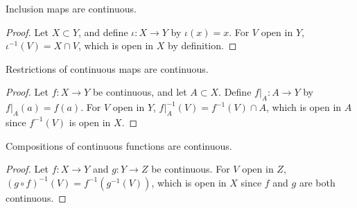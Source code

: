 \documentclass[10pt]{report}
\begin{document}
\begin{prop}
Inclusion maps are continuous.
\end{prop}
\begin{proof}
	Let $X \subset Y$, and define $\iota:X\to Y$ by $\iota(x)=x$. For $V$ open in $Y$, $\iota^{-1}(V)=X \cap V$, which is open in $X$ by definition.
\end{proof}

\begin{prop}
Restrictions of continuous maps are continuous.
\end{prop}
\begin{proof}
	Let $f:X\to Y$ be continuous, and let $A \subset X$. Define $f|_{A}:A\to Y$ by $f|_{A}(a)=f(a)$. For $V$ open in $Y$, $f|_{A}^{-1}(V) = f^{-1}(V) \cap A$, which is open in $A$ since $f^{-1}(V)$ is open in $X$.
\end{proof}

\begin{prop}
Compositions of continuous functions are continuous.
\end{prop}
\begin{proof}
	Let $f:X\to Y$ and $g:Y\to Z$ be continuous. For $V$ open in $Z$, $(g \circ f)^{-1}(V) = f^{-1}(g^{-1}(V))$, which is open in $X$ since $f$ and $g$ are both continuous.
\end{proof}
\end{document}
